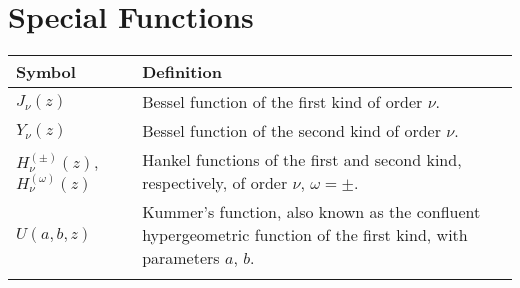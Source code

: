\section*{Special Functions}
\begin{tabularx}{\textwidth}{lX}
  \hline\hline
  Symbol		& Definition	\\
  \hline\hline
  $J_\nu(z)$		& Bessel function of the first kind of order $\nu$.	\\
  $Y_\nu(z)$		& Bessel function of the second kind of order $\nu$.	\\
  $H_\nu^{(\pm)}(z)$, %
  $H_\nu^{(\omega)}(z)$& Hankel functions of the first and second kind, respectively, of order $\nu$, $\omega=\pm$.\\
  $U(a,b,z)$		& Kummer's function, also known as the confluent hypergeometric function of the first kind, with parameters $a$, $b$. \\
  \hline\hline				\\
\end{tabularx}

